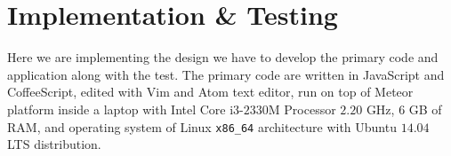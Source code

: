 \chapter{Implementation \& Testing}
\label{chap:implementation-testing}

Here we are implementing the design we have to develop the primary code and application along with the test.
The primary code are written in JavaScript and CoffeeScript, edited with Vim and Atom text editor, run on top of Meteor platform inside a laptop with Intel Core i3-$2330$M Processor $2.20$ GHz, $6$ GB of RAM, and operating system of Linux \verb|x86_64| architecture with Ubuntu $14.04$ LTS distribution.
